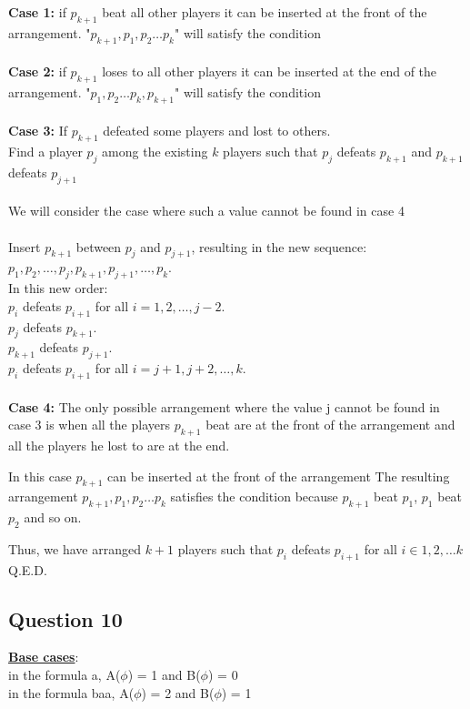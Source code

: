 \documentclass[11pt]{article}
\begin{document}
{{{\noindent
\textbf{Case 1:}
if $p_{k+1}$ beat all other players it can be inserted at the front of the arrangement.
"$p_{k+1}, p_1, p_2 \ldots p_{k}$" will satisfy the condition \\
\\
\textbf{Case 2:}
if $p_{k+1}$ loses to all other players it can be inserted at the end of the arrangement.
"$p_1, p_2 \ldots p_{k}, p_{k+1}$" will satisfy the condition\\
\\
\textbf{Case 3:}
If $p_{k+1}$ defeated some players and lost to others.\\
Find a player $p_j$ among the existing $k$ players such that
$p_{j}$ defeats $p_{k+1}$ and $p_{k+1}$ defeats $p_{j+1}$ \\
\\
We will consider the case where such a value cannot be found in case 4\\
\\
Insert $p_{k+1}$ between $p_j$ and $p_{j+1}$, resulting in the new sequence:\\
$p_1, p_2, \ldots, p_j, p_{k+1}, p_{j+1}, \ldots, p_k$.\\
In this new order:\\
$p_i$ defeats $p_{i+1}$ for all $i = 1, 2, \ldots, j-2$.\\
$p_j$ defeats $p_{k+1}$.\\
$p_{k+1}$ defeats $p_{j+1}$.\\
$p_i$ defeats $p_{i+1}$ for all $i = j+1, j+2, \ldots, k$.\\
\\
\textbf{Case 4:}
The only possible arrangement where the value j cannot be found
in case 3 is when all the players $p_{k+1}$
beat are at the front of the arrangement
and all the players he lost to are at the end.

\noindent
In this case $p_{k+1}$ can be inserted at the front of the arrangement
The resulting arrangement $p_{k+1}, p_1, p_2 \ldots p_k$
satisfies the condition because $p_{k+1}$ beat $p_1$,
$p_1$ beat $p_2$ and so on.

\noindent
Thus, we have arranged $k+1$ players such that $p_i$ defeats $p_{i+1}$
for all $i \in 1, 2, \ldots k$\\
Q.E.D.

\subsection*{Question 10}
\underline{\textbf{Base cases}}: \\
in the formula a,
A($\phi$) = 1 and B($\phi$) = 0 \\
in the formula baa,
A($\phi$) = 2 and B($\phi$) = 1

}}}
\end{document}
